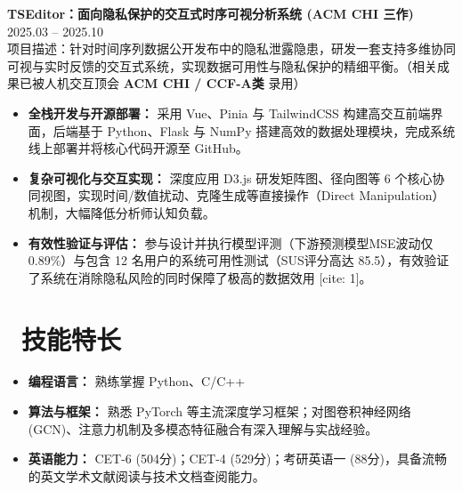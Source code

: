 \documentclass[11pt]{article}
\newlength{\interProjectSpacing}
\newcommand{\projectsep}{\vspace{\interProjectSpacing}}
\newlength{\intraProjectTitleSep}
\newcommand{\titlebreak}{\\[\intraProjectTitleSep]}
\newlength{\intraProjectListTopSep}
\begin{document}
\projectsep

\textbf{TSEditor：面向隐私保护的交互式时序可视分析系统 (ACM CHI 三作)} \hfill 2025.03 -- 2025.10 \titlebreak
项目描述：针对时间序列数据公开发布中的隐私泄露隐患，研发一套支持多维协同可视与实时反馈的交互式系统，实现数据可用性与隐私保护的精细平衡。（相关成果已被人机交互顶会 \textbf{ACM CHI / CCF-A类} 录用）
\begin{itemize}[nosep, topsep=\intraProjectListTopSep]
    \item \textbf{全栈开发与开源部署：} 采用 Vue、Pinia 与 TailwindCSS 构建高交互前端界面，后端基于 Python、Flask 与 NumPy 搭建高效的数据处理模块，完成系统线上部署并将核心代码开源至 GitHub。
    \item \textbf{复杂可视化与交互实现：} 深度应用 D3.js 研发矩阵图、径向图等 6 个核心协同视图，实现时间/数值扰动、克隆生成等直接操作（Direct Manipulation）机制，大幅降低分析师认知负载。
    \item \textbf{有效性验证与评估：} 参与设计并执行模型评测（下游预测模型MSE波动仅0.89\%）与包含 12 名用户的系统可用性测试（SUS评分高达 85.5），有效验证了系统在消除隐私风险的同时保障了极高的数据效用 [cite: 1]。
\end{itemize}

\section{\makebox[\widthof{\faCogs}][c]{\color{CVBlue}\faCogs}\ 技能特长}
\begin{itemize}[nosep]
    \item \textbf{编程语言：} 熟练掌握 Python、C/C++
    \item \textbf{算法与框架：} 熟悉 PyTorch 等主流深度学习框架；对图卷积神经网络 (GCN)、注意力机制及多模态特征融合有深入理解与实战经验。
    \item \textbf{英语能力：} CET-6 (504分)；CET-4 (529分)；考研英语一 (88分)，具备流畅的英文学术文献阅读与技术文档查阅能力。
\end{itemize}
\end{document}
